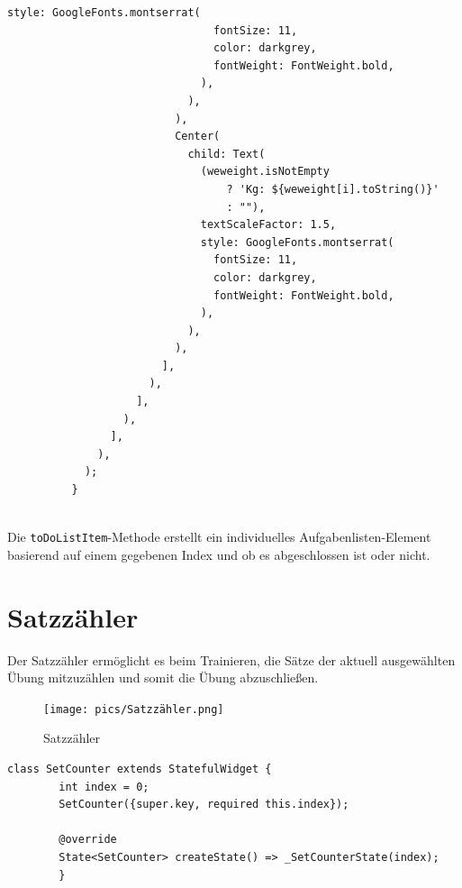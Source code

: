 \begin{lstlisting}[caption=To-Do-Liste Item Methode,label=lst:impl:frontend:qrcode]
                              style: GoogleFonts.montserrat(
                                fontSize: 11,
                                color: darkgrey,
                                fontWeight: FontWeight.bold,
                              ),
                            ),
                          ),
                          Center(
                            child: Text(
                              (weweight.isNotEmpty
                                  ? 'Kg: ${weweight[i].toString()}'
                                  : ""),
                              textScaleFactor: 1.5,
                              style: GoogleFonts.montserrat(
                                fontSize: 11,
                                color: darkgrey,
                                fontWeight: FontWeight.bold,
                              ),
                            ),
                          ),
                        ],
                      ),
                    ],
                  ),
                ],
              ),
            );
          }
        
    \end{lstlisting}

    Die \texttt{toDoListItem}-Methode erstellt ein individuelles Aufgabenlisten-Element basierend auf einem gegebenen Index und ob es abgeschlossen ist oder nicht.

    \section{Satzzähler}
    \author{Antonio Kuvac}

    Der Satzzähler ermöglicht es beim Trainieren, die Sätze der aktuell ausgewählten Übung mitzuzählen und somit die Übung abzuschließen.

    \begin{figure}[H]
        \centering
        \texttt{[image: pics/Satzzähler.png]}
        \caption{Satzzähler}
    \end{figure}

    \begin{lstlisting}[caption=SetCounter,label=lst:impl:frontend:qrcode]
        class SetCounter extends StatefulWidget {
        int index = 0;
        SetCounter({super.key, required this.index});
        
        @override
        State<SetCounter> createState() => _SetCounterState(index);
        }
        \end{lstlisting}
        
